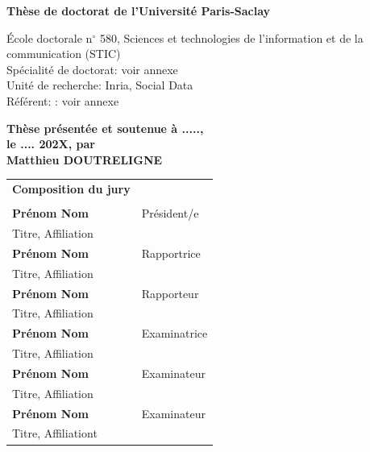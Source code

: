 \documentclass[french,12pt,twoside,a4paper]{book}
\begin{document}
\begin{titlepage}
  \textbf{Thèse de doctorat de l'Université Paris-Saclay}


  \vspace{15mm}

  École doctorale n$^{\circ}$  580,
  Sciences et technologies de l'information et de la communication (STIC)\\
  \small Spécialité de doctorat: voir annexe\\
  \footnotesize Unité de recherche: Inria, Social Data\\
  \footnotesize Référent: : voir annexe
  \vspace{15mm}

  \textbf{Thèse présentée et soutenue à .....,\\ le .... 202X, par}\\
  \bigskip
  \Large {\color{Prune} \textbf{Matthieu DOUTRELIGNE}}


  \vspace{\fill} %

  \bigskip

  \flushleft

  \scriptsize
  \begin{tabular}{|p{7cm}l}
    \arrayrulecolor{Prune}
    {\footnotesize \textbf{Composition du jury}} \\
                        &                        \\
    \textbf{Prénom Nom} & Président/e            \\
    Titre, Affiliation  &                        \\
    \textbf{Prénom Nom} & Rapportrice            \\
    Titre, Affiliation  &                        \\
    \textbf{Prénom Nom} & Rapporteur             \\
    Titre, Affiliation  &                        \\
    \textbf{Prénom Nom} & Examinatrice           \\
    Titre, Affiliation  &                        \\
    \textbf{Prénom Nom} & Examinateur            \\
    Titre, Affiliation  &                        \\
    \textbf{Prénom Nom} & Examinateur            \\
    Titre, Affiliationt &                        \\
  \end{tabular}


\end{titlepage}
\end{document}
